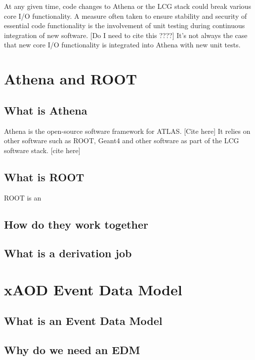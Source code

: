 At any given time, code changes to Athena or the LCG stack could break various core I/O functionality. \cite{atlascollaboration2024softwarecomputingrun3}
A measure often taken to ensure stability and security of essential code functionality is the involvement of unit testing during continuous integration of new software. [Do I need to cite this ????] 
It's not always the case that new core I/O functionality is integrated into Athena with new unit tests. 

\section{Athena and ROOT}
\subsection{What is Athena}
Athena is the open-source software framework for ATLAS. [Cite here]
It relies on other software such as ROOT, Geant4 and other software as part of the LCG software stack. [cite here]

\subsection{What is ROOT}
ROOT is an 

\subsection{How do they work together}
\subsection{What is a derivation job}

\section{xAOD Event Data Model}
\subsection{What is an Event Data Model}
\subsection{Why do we need an EDM}


